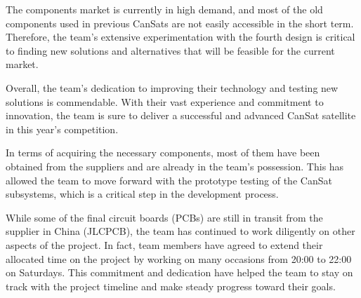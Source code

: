 \documentclass[11pt]{article}
\begin{document}
The components market is currently in high demand, and most of the old components used in previous CanSats are not easily accessible in the short term. Therefore, the team's extensive experimentation with the fourth design is critical to finding new solutions and alternatives that will be feasible for the current market.

Overall, the team's dedication to improving their technology and testing new solutions is commendable. With their vast experience and commitment to innovation, the team is sure to deliver a successful and advanced CanSat satellite in this year's competition.

In terms of acquiring the necessary components, most of them have been obtained from the suppliers and are already in the team's possession. This has allowed the team to move forward with the prototype testing of the CanSat subsystems, which is a critical step in the development process.

While some of the final circuit boards (PCBs) are still in transit from the supplier in China (JLCPCB), the team has continued to work diligently on other aspects of the project. In fact, team members have agreed to extend their allocated time on the project by working on many occasions from 20:00 to 22:00 on Saturdays. This commitment and dedication have helped the team to stay on track with the project timeline and make steady progress toward their goals.
\end{document}
